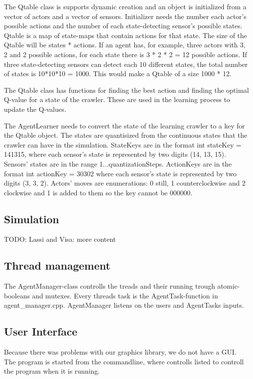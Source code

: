 \documentclass{article}
\begin{document}
The Qtable class is supports dynamic creation and an object is initialized
from a vector of actors and a vector of sensors. Initializer needs
the number each actor's possible actions and the number of each
state-detecting sensor's possible states. Qtable is a map of
state-maps that contain actions for that state. The size of the Qtable
will be states * actions. If an agent has, for example, three actors
with 3, 2 and 2 possible actions, for each state there is
3 * 2 * 2 = 12 possible actions. If three state-detecting sensors can
detect each 10 different states, the total number of states is
10*10*10 = 1000. This would make a Qtable of a size 1000 * 12.

The Qtable class has functions for finding the best action and finding
the optimal Q-value for a state of the crawler. These are used in the
learning process to update the Q-values.

The AgentLearner needs to convert the state of the learning crawler to a key
for the Qtable object. The states are quantisized from the continuous states
that the crawler can have in the simulation. StateKeys are in the format
int stateKey = 141315, where each sensor's
state is represented by two digits (14, 13, 15). Sensors' states are
in the range 1...quantizationSteps. ActionKeys are in the format
int actionKey = 30302 where each sensor's
state is represented by two digits (3, 3, 2). Actors' moves are
enumerations: 0 still, 1 counterclockwise and 2 clockwise and 1 is
added to them so the key cannot be 000000.

\subsection{Simulation}
TODO: Lassi and Visa: more content

\subsection{Thread management}
The AgentManager-class controlls the treads and their running trough
atomic-booleans and mutexes. Every threads task is the AgentTask-function
in agent\_manager.cpp. AgentManager listens on the users and AgentTasks
inputs.

\subsection{User Interface}
Because there was problems with our graphics library, we do not have a GUI.
The program is started from the commandline, where controlls listed
to controll the program when it is running.
\end{document}
